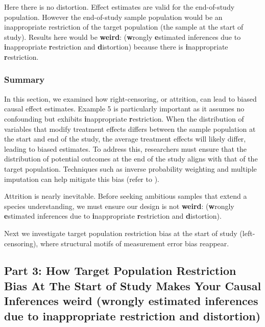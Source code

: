 \documentclass[
  single column]{article}
\begin{document}
Here there is no distortion. Effect estimates are valid for the
end-of-study population. However the end-of-study sample population
would be an inappropriate restriction of the target population (the
sample at the start of study). Results here would be \textbf{weird}:
(\textbf{w}rongly \textbf{e}stimated inferences due to
\textbf{i}nappropriate \textbf{r}estriction and \textbf{d}istortion)
because there is \textbf{i}nappropriate \textbf{r}estriction.

\subsubsection{Summary}\label{summary-1}

In this section, we examined how right-censoring, or attrition, can lead
to biased causal effect estimates. Example 5 is particularly important
as it assumes no confounding but exhibits \textbf{i}nappropriate
\textbf{r}estriction. When the distribution of variables that modify
treatment effects differs between the sample population at the start and
end of the study, the average treatment effects will likely differ,
leading to biased estimates. To address this, researchers must ensure
that the distribution of potential outcomes at the end of the study
aligns with that of the target population. Techniques such as inverse
probability weighting and multiple imputation can help mitigate this
bias (refer to ).

Attrition is nearly inevitable. Before seeking ambitious samples that
extend a species understanding, we must ensure our design is not
\textbf{weird}: (\textbf{w}rongly \textbf{e}stimated inferences due to
\textbf{i}nappropriate \textbf{r}estriction and \textbf{d}istortion).

Next we investigate target population restriction bias at the start of
study (left-censoring), where structural motifs of measurement error
bias reappear.

\newpage{}

\subsection{\texorpdfstring{Part 3: How Target Population Restriction
Bias At The Start of Study Makes Your Causal Inferences weird
(\textbf{w}rongly \textbf{e}stimated inferences due to
\textbf{i}nappropriate \textbf{r}estriction and
\textbf{d}istortion)}{Part 3: How Target Population Restriction Bias At The Start of Study Makes Your Causal Inferences weird (wrongly estimated inferences due to inappropriate restriction and distortion)}}\label{id-sec-3}
\end{document}
